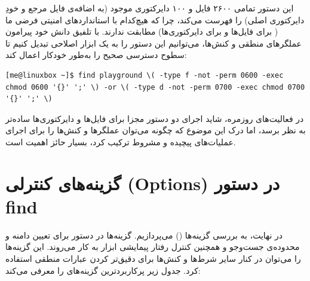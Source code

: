 این دستور تمامی ۲۶۰۰ فایل و ۱۰۰ دایرکتوری موجود (به اضافه‌ی فایل مرجع و خودِ دایرکتوری اصلی) را فهرست می‌کند، چرا که هیچ‌کدام با استانداردهای امنیتی فرضی ما ( برای فایل‌ها و  برای دایرکتوری‌ها) مطابقت ندارند. با تلفیق دانش خود پیرامون عملگرهای منطقی و کنش‌ها، می‌توانیم این دستور را به یک ابزار اصلاحی تبدیل کنیم تا سطوح دسترسی صحیح را به‌طور خودکار اعمال کند:

\begin{latin}
\begin{lstlisting}
[me@linuxbox ~]$ find playground \( -type f -not -perm 0600 -exec chmod 0600 '{}' ';' \) -or \( -type d -not -perm 0700 -exec chmod 0700 '{}' ';' \)
\end{lstlisting}
\end{latin}

در فعالیت‌های روزمره، شاید اجرای دو دستور مجزا برای فایل‌ها و دایرکتوری‌ها ساده‌تر به نظر برسد، اما درک این موضوع که چگونه می‌توان عملگرها و کنش‌ها را برای اجرای عملیات‌های پیچیده و مشروط ترکیب کرد، بسیار حائز اهمیت است.

\section{گزینه‌های کنترلی (Options) در دستور find}

در نهایت، به بررسی گزینه‌ها () می‌پردازیم. گزینه‌ها در دستور  برای تعیین دامنه و محدوده‌ی جست‌وجو و همچنین کنترل رفتار پیمایشی ابزار به کار می‌روند. این گزینه‌ها را می‌توان در کنار سایر شرط‌ها و کنش‌ها برای دقیق‌تر کردن عبارات منطقی استفاده کرد. جدول زیر پرکاربردترین گزینه‌های  را معرفی می‌کند:

